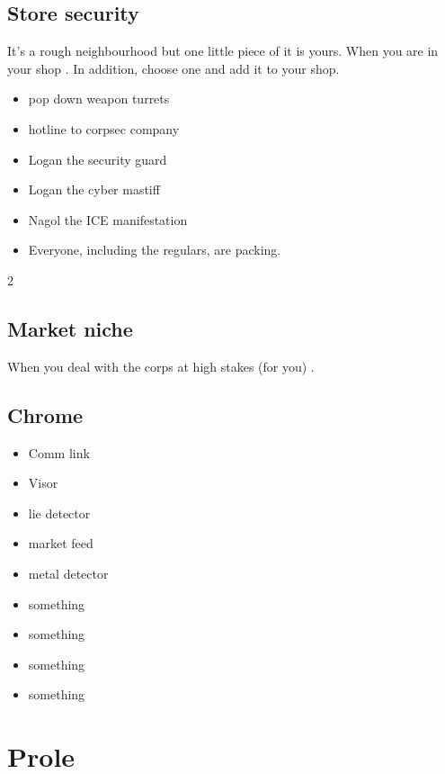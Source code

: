 \documentclass{tufte-book}
\begin{document}
\subsection{Store security}
It's a rough neighbourhood but one little piece of it is yours. When you are in your shop .
In addition, choose one and add it to your shop.
\begin{multicols}{2}
\begin{itemize}
 \item pop down weapon turrets
\item hotline to corpsec company
\item Logan the security guard
\item Logan the cyber mastiff
\item Nagol the ICE manifestation
\item Everyone, including the regulars, are packing.
\end{itemize}
\end{multicols}{2}

\subsection{Market niche}
When you deal with the corps at high stakes (for you) .


\subsection{Chrome}
\begin{multicols}{3}
\begin{itemize}
\item Comm link
\item Visor
\item lie detector
\item market feed
\item metal detector
\item something
\item something
\item something
\item something
\end{itemize}
\end{multicols}




\section{Prole} \label{sec:Prole}
\end{document}
